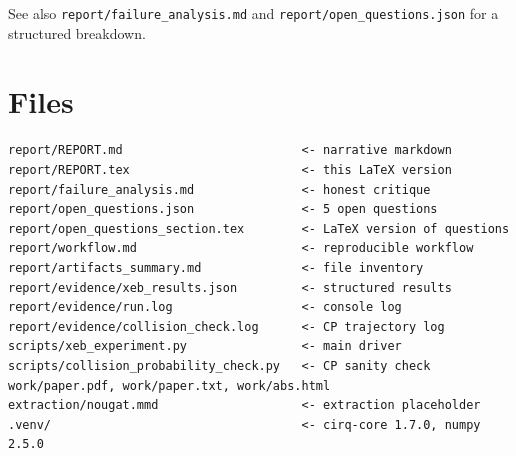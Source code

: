 \documentclass[11pt]{article}
\begin{document}
See also \texttt{report/failure\_analysis.md} and
\texttt{report/open\_questions.json} for a structured breakdown.

\section{Files}
\begin{lstlisting}
report/REPORT.md                         <- narrative markdown
report/REPORT.tex                        <- this LaTeX version
report/failure_analysis.md               <- honest critique
report/open_questions.json               <- 5 open questions
report/open_questions_section.tex        <- LaTeX version of questions
report/workflow.md                       <- reproducible workflow
report/artifacts_summary.md              <- file inventory
report/evidence/xeb_results.json         <- structured results
report/evidence/run.log                  <- console log
report/evidence/collision_check.log      <- CP trajectory log
scripts/xeb_experiment.py                <- main driver
scripts/collision_probability_check.py   <- CP sanity check
work/paper.pdf, work/paper.txt, work/abs.html
extraction/nougat.mmd                    <- extraction placeholder
.venv/                                   <- cirq-core 1.7.0, numpy 2.5.0
\end{lstlisting}
\end{document}
